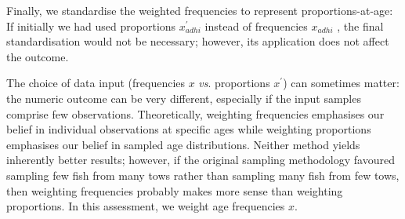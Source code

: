 Finally, we standardise the weighted frequencies to represent proportions-at-age:
%
%
If initially we had used proportions $x_{adhi}^\prime$ instead of frequencies $x_{adhi}$ , the final standardisation would not be necessary; however, its application does not affect the outcome.

The choice of data input (frequencies $x$ \emph{vs}. proportions $x^\prime$) can sometimes matter: the numeric outcome can be very different, especially if the input samples comprise few observations. Theoretically, weighting frequencies emphasises our belief in individual observations at specific ages while weighting proportions emphasises our belief in sampled age distributions. Neither method yields inherently better results; however, if the original sampling methodology favoured sampling few fish from many tows rather than sampling many fish from few tows, then weighting frequencies probably makes more sense than weighting proportions. In this assessment, we weight age frequencies $x$.

\newpage
